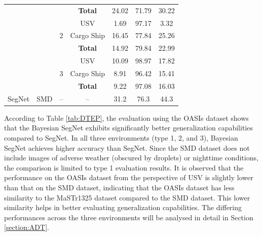 \begin{table}[ht!]
\begin{tabular}{c|c|c|c|c|c|c}
     & &                    & \textbf{Total} & 24.02 & 71.79 & 30.22 \\ \cline{3-7}
     & & \multirow{3}{*}{2} & USV & 1.69 & 97.17 & 3.32 \\ \cline{4-7}
     & &                    & Cargo Ship & 16.45 & 77.84 & 25.26 \\ \cline{4-7}
     & &                    & \textbf{Total} & 14.92 & 79.84 & 22.99 \\ \cline{3-7}
     & & \multirow{3}{*}{3} & USV & 10.09 & 98.97 & 17.82 \\ \cline{4-7}
     & &                    & Cargo Ship & 8.91 & 96.42 & 15.41 \\ \cline{4-7}
     & &                    & \textbf{Total} & 9.22 & 97.08 & 16.03 \\ \hline
    SegNet & SMD & -- & -- & 31.2 & 76.3 & 44.3 \\ \hline
    \end{tabular}
\end{table}

According to Table \ref{tab:DTEP}, the evaluation using the OASIs dataset shows that the Bayesian SegNet exhibits 
significantly better generalization capabilities compared to SegNet. In all three environments (type 1, 2, and 3), 
Bayesian SegNet achieves higher accuracy than SegNet. Since the SMD dataset does not include images of adverse 
weather (obscured by droplets) or nighttime conditions, the comparison is limited to type 1 evaluation results. 
It is observed that the performance on the OASIs dataset from the perspective of USV is slightly lower than that on 
the SMD dataset, indicating that the OASIs dataset has less similarity to the MaSTr1325 dataset compared to the SMD 
dataset. This lower similarity helps in better evaluating generalization capabilities. The differing performances 
across the three environments will be analysed in detail in Section \ref{section:ADT}.